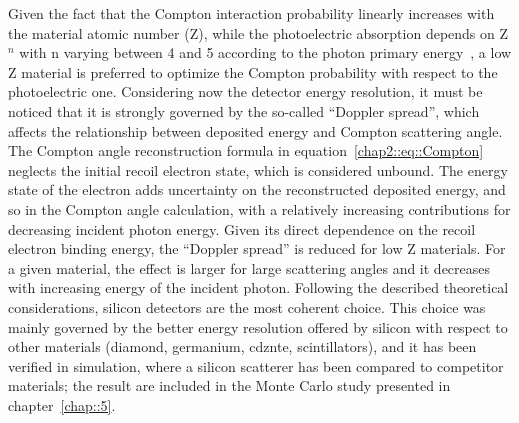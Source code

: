 Given the fact that the Compton interaction probability linearly increases with the material atomic number (Z), while the photoelectric absorption depends on Z$^{n}$ with n varying between 4 and 5 according to the photon primary energy~\parencite{Knoll2000}, a low Z material is preferred to optimize the Compton probability with respect to the photoelectric one. Considering now the detector energy resolution, it must be noticed that it is strongly governed by the so-called \enquote{Doppler spread}, which affects the relationship between deposited energy and Compton scattering angle. The Compton angle reconstruction formula in equation~\ref{chap2::eq::Compton} neglects the initial recoil electron state, which is considered unbound. %
The energy state of the electron adds uncertainty on the reconstructed deposited energy, and so in the Compton angle calculation, with a relatively increasing contributions for decreasing incident photon energy. Given its direct dependence on the recoil electron binding energy, the \enquote{Doppler spread} is reduced for low Z materials. For a given material, the effect is larger for large scattering angles and it decreases with increasing energy of the incident photon. Following the described theoretical considerations, silicon detectors are the most coherent choice. This choice was mainly governed by the better energy resolution offered by silicon with respect to other materials (diamond, germanium, \gls{cdznte}, scintillators), and it has been verified in simulation, where a silicon scatterer has been compared to competitor materials; the result are included in the Monte Carlo study presented in chapter~\ref{chap::5}.

